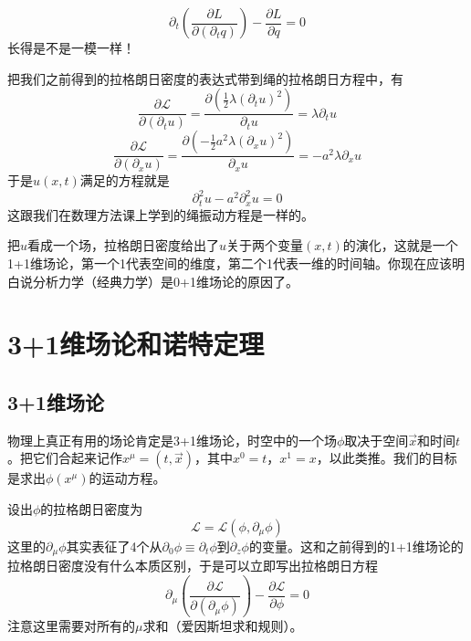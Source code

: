 \documentclass[a4paper,11pt]{ctexart}
\newcommand{\beq}{\begin{equation}}
\newcommand{\eeq}{\end{equation}}
\newcommand{\lag}{\mathcal{L}}
\begin{document}
\beq
\partial_t(\frac{\partial L}{\partial (\partial_t q)}) - \frac{\partial L}{\partial q} = 0
\eeq
长得是不是一模一样！
\par
把我们之前得到的拉格朗日密度的表达式带到绳的拉格朗日方程中，有
\beq
\frac{\partial \lag}{\partial ({\partial_t u})} = \frac{\partial (\frac{1}{2}\lambda (\partial_t u)^2)}{\partial_t u}= \lambda \partial_t u
\eeq
\beq
\frac{\partial \lag}{\partial ({\partial_x u})} = \frac{\partial (-\frac{1}{2}a^2\lambda (\partial_x u)^2)}{\partial_x u} = -a^2 \lambda \partial_x u
\eeq
于是$u(x,t)$满足的方程就是
\beq
\partial_t^2 u - a^2 \partial_x^2 u = 0
\eeq
这跟我们在数理方法课上学到的绳振动方程是一样的。
\par
把$u$看成一个场，拉格朗日密度给出了$u$关于两个变量$(x,t)$的演化，这就是一个1+1维场论，第一个1代表空间的维度，第二个1代表一维的时间轴。你现在应该明白说分析力学（经典力学）是0+1维场论的原因了。

\section{3+1维场论和诺特定理}
\subsection{3+1维场论}
物理上真正有用的场论肯定是3+1维场论，时空中的一个场$\phi$取决于空间$\vec{x}$和时间$t$。把它们合起来记作$x^\mu = (t,\vec{x})$，其中$x^0 = t$，$x^1 = x$，以此类推。我们的目标是求出$\phi(x^\mu)$的运动方程。
\par
设出$\phi$的拉格朗日密度为
\beq
\lag = \lag(\phi,\partial_\mu \phi)
\eeq
这里的$\partial_\mu \phi$其实表征了4个从$\partial_0 \phi \equiv \partial_t \phi$到$\partial_z \phi$的变量。这和之前得到的1+1维场论的拉格朗日密度没有什么本质区别，于是可以立即写出拉格朗日方程
\beq
\partial_\mu (\frac{\partial \lag}{\partial (\partial_\mu \phi)}) - \frac{\partial \lag}{\partial \phi} = 0
\eeq
注意这里需要对所有的$\mu$求和（爱因斯坦求和规则）。
\end{document}
